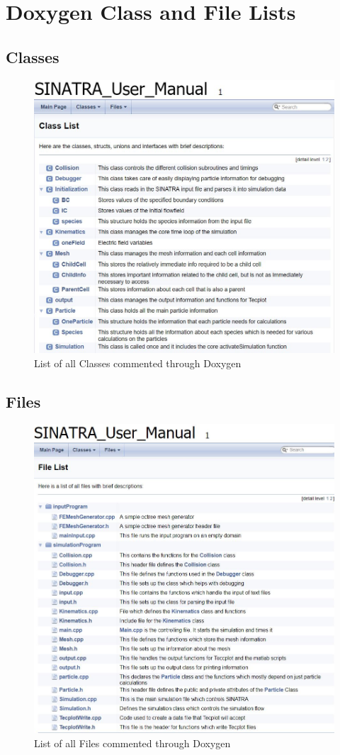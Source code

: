 \chapter{Doxygen Class and File Lists}
\label{app:doxygenlists}


\section{Classes}
\begin{figure}[h]
\includegraphics[width=.95\textwidth]{figures/ClassList.JPG}
\centering
\caption{List of all Classes commented through Doxygen}
\label{fig:ClassList}
\end{figure}


\newpage
\section{Files}
\begin{figure}[h]
\includegraphics[width=.95\textwidth]{figures/FileList.JPG}
\centering
\caption{List of all Files commented through Doxygen}
\label{fig:FileList}
\end{figure}


